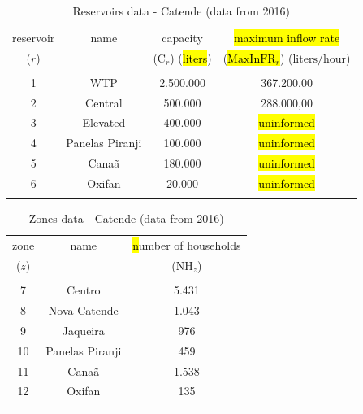 \documentclass{singlecol}
\theoremstyle{TH}{
\newtheorem{lemma}{Lemma}
\newtheorem{theorem}[lemma]{Theorem}
\newtheorem{corrolary}[lemma]{Corrolary}
\newtheorem{conjecture}[lemma]{Conjecture}
\newtheorem{proposition}[lemma]{Proposition}
\newtheorem{claim}[lemma]{Claim}
\newtheorem{stheorem}[lemma]{Wrong Theorem}
\newtheorem{algorithm}{Algorithm}
}
\theoremstyle{THrm}{
\newtheorem{definition}{Definition}[section]
\newtheorem{question}{Question}[section]
\newtheorem{remark}{Remark}
\newtheorem{scheme}{Scheme}
}
\theoremstyle{THhit}{
\newtheorem{case}{Case}[section]
}
\begin{document}
\begin{table}[H]
\begin{center}
	\begin{tabular}{ c  c  c  c } 
		reservoir      & name              & capacity                       & \hl{maximum inflow rate}    \\
		($r$)          &             	   &  ($\mathrm{C}_{r}$) (\hl{liters})    &  (\hl{$\mathrm{MaxInFR}_{r}$}) ($\mathrm{liters/hour}$) \\
		\\
		1              & WTP               & 2.500.000            &  367.200,00   \\
		2              & Central           &   500.000 		&  288.000,00   \\
		3              & Elevated          &   400.000            & \hl{uninformed} \\
		4              & Panelas Piranji   &   100.000            & \hl{uninformed} \\
		5              & Canaã             &   180.000            & \hl{uninformed} \\
		6              & Oxifan            &    20.000            & \hl{uninformed} \\
		\\
	\end{tabular}
\caption{Reservoirs data - Catende (data from 2016)}
\label{tab:reservoirsCatende}
\end{center}
\end{table}

\begin{table}[H]
\begin{center}
	\begin{tabular}{ c  c  c } 
		zone          & name         & \hl{n}umber of households \\
		($z$)          &              & ($\mathrm{NH}_{z}$)   \\
		                                               \\
		7              & Centro           & 5.431 \\
		8              & Nova Catende     & 1.043 \\
		9              & Jaqueira         &   976 \\
	   10              & Panelas Piranji  &   459 \\
	   11              & Canaã            & 1.538 \\
	   12              & Oxifan           &   135 \\
	   \\
	\end{tabular}
\caption{Zones data - Catende (data from 2016)}
\label{tab:zonesCatende}
\end{center}
\end{table}
\end{document}
